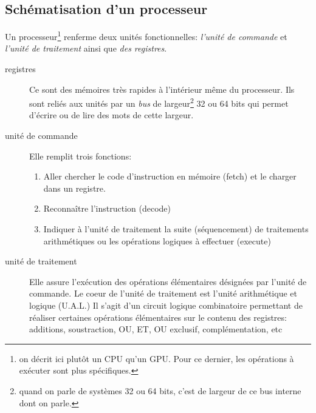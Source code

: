 \subsection{Schématisation d'un processeur}
Un processeur\footnote{on décrit ici plutôt un CPU qu'un GPU. Pour ce dernier, les opérations à exécuter sont plus spécifiques.} renferme deux unités fonctionnelles: \emph{l'unité de commande} et \emph{l'unité de traitement} ainsi que \emph{des registres}.
\begin{description}
 \item[registres] Ce sont des mémoires très rapides à l'intérieur même du processeur. Ils sont reliés aux unités par un \emph{bus} de largeur\footnote{quand on parle de systèmes 32 ou 64 bits, c'est de largeur de ce bus interne dont on parle.} 32 ou 64 bits qui permet d'écrire ou de lire des mots de cette largeur.
 \item[unité de commande] Elle remplit trois fonctions:
 \begin{enumerate}
  \item Aller chercher le code d'instruction en mémoire (fetch) et le charger dans un registre.
  \item Reconnaître l'instruction (decode)
  \item Indiquer à l'unité de traitement la suite (séquencement) de traitements arithmétiques ou les opérations logiques à effectuer (execute) 
 \end{enumerate}
 \item[unité de traitement] Elle assure l'exécution des opérations élémentaires désignées par l'unité de commande. Le coeur de l'unité de traitement est l'unité arithmétique et logique (U.A.L.) Il s'agit d'un circuit logique combinatoire permettant de réaliser certaines opérations élémentaires sur le contenu des registres: additions, soustraction, OU, ET, OU exclusif, complémentation, etc 
\end{description}

